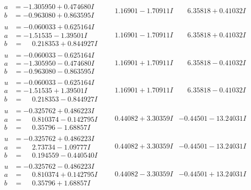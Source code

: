 \documentclass[1p]{elsarticle_modified}
\theoremstyle{definition}
\begin{document}
$$\begin{array}{c|c|c}
\begin{aligned}
a &= -1.305950 + 0.474680 I \\
b &= -0.963080 + 0.863595 I\end{aligned}
 & \phantom{-}1.16901 - 1.70911 I & \phantom{-}6.35818 + 0.41032 I \\ \hline\begin{aligned}
u &= -0.060033 + 0.625164 I \\
a &= -1.51535 - 1.39501 I \\
b &= \phantom{-}0.218353 + 0.844927 I\end{aligned}
 & \phantom{-}1.16901 - 1.70911 I & \phantom{-}6.35818 + 0.41032 I \\ \hline\begin{aligned}
u &= -0.060033 - 0.625164 I \\
a &= -1.305950 - 0.474680 I \\
b &= -0.963080 - 0.863595 I\end{aligned}
 & \phantom{-}1.16901 + 1.70911 I & \phantom{-}6.35818 - 0.41032 I \\ \hline\begin{aligned}
u &= -0.060033 - 0.625164 I \\
a &= -1.51535 + 1.39501 I \\
b &= \phantom{-}0.218353 - 0.844927 I\end{aligned}
 & \phantom{-}1.16901 + 1.70911 I & \phantom{-}6.35818 - 0.41032 I \\ \hline\begin{aligned}
u &= -0.325762 + 0.486223 I \\
a &= \phantom{-}0.810374 - 0.142795 I \\
b &= \phantom{-}0.35796 - 1.68857 I\end{aligned}
 & \phantom{-}0.44082 + 3.30359 I & -0.44501 - 13.24031 I \\ \hline\begin{aligned}
u &= -0.325762 + 0.486223 I \\
a &= \phantom{-}2.73734 - 1.09777 I \\
b &= \phantom{-}0.194559 - 0.440540 I\end{aligned}
 & \phantom{-}0.44082 + 3.30359 I & -0.44501 - 13.24031 I \\ \hline\begin{aligned}
u &= -0.325762 - 0.486223 I \\
a &= \phantom{-}0.810374 + 0.142795 I \\
b &= \phantom{-}0.35796 + 1.68857 I\end{aligned}
 & \phantom{-}0.44082 - 3.30359 I & -0.44501 + 13.24031 I \\ \hline\begin{aligned}

\end{aligned}
\end{array}$$
\end{document}

